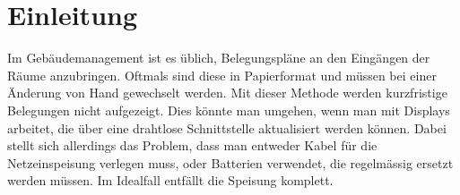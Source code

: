 \section{Einleitung}
\label{sec:intro}

Im Gebäudemanagement ist es üblich, Belegungspläne an den Eingängen der Räume anzubringen.
Oftmals sind diese in Papierformat und müssen bei einer Änderung von Hand gewechselt werden.
Mit dieser Methode werden kurzfristige Belegungen nicht aufgezeigt.
Dies könnte man umgehen, wenn man mit Displays arbeitet, die über eine drahtlose Schnittstelle aktualisiert werden können.
Dabei stellt sich allerdings das Problem, dass man entweder Kabel für die Netzeinspeisung verlegen muss, oder Batterien verwendet, die regelmässig ersetzt werden müssen.
Im Idealfall entfällt die Speisung komplett.
